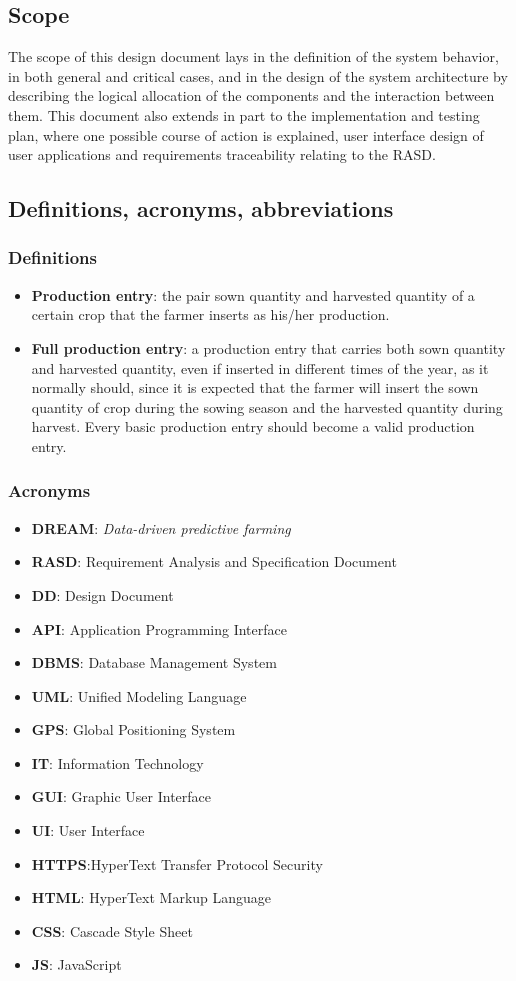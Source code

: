 \documentclass[table, 12pt]{article}
\begin{document}
\subsection{Scope}
The scope of this design document lays in the definition of the system behavior, in both general and critical cases, and in the design of the system architecture by describing the
logical allocation of the components and the interaction between them.
This document also extends in part to the implementation and testing plan, where one possible course of action is explained, user interface design of user applications and requirements traceability relating to the RASD.
\subsection{Definitions, acronyms, abbreviations}
\subsubsection*{Definitions}
\begin{itemize}
    \item \textbf{Production entry}: the pair sown quantity and harvested quantity of a certain crop that the farmer inserts as his/her production.
    \item \textbf{Full production entry}: a production entry that carries both sown quantity and harvested quantity, even if inserted in different times of the year, as it normally should, since it is expected that the farmer will insert the sown quantity of crop during the sowing season and the harvested quantity during harvest. Every basic production entry should become a valid production entry.
\end{itemize}
\subsubsection*{Acronyms}
\begin{itemize}
    \item \textbf{DREAM}: \emph{Data-driven predictive farming}
    \item \textbf{RASD}: Requirement Analysis and Specification Document
    \item \textbf{DD}: Design Document
    \item \textbf{API}: Application Programming Interface
    \item \textbf{DBMS}: Database Management System
    \item \textbf{UML}: Unified Modeling Language
    \item \textbf{GPS}: Global Positioning System
    \item \textbf{IT}: Information Technology
    \item \textbf{GUI}: Graphic User Interface
    \item \textbf{UI}: User Interface
    \item \textbf{HTTPS}:HyperText Transfer Protocol Security
    \item \textbf{HTML}: HyperText Markup Language
    \item \textbf{CSS}: Cascade Style Sheet
    \item \textbf{JS}: JavaScript
\end{itemize}
\end{document}
